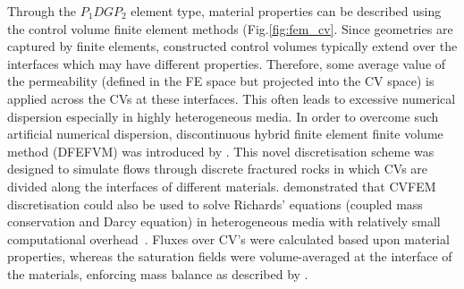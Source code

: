 \documentclass[preprint,authoryear,12pt]{elsarticle}
\newcommand{\KCnote}[1]{\fbox{\parbox{\textwidth}{ \color{black} KC Note $\Rightarrow$ #1}}}
\begin{document}
Through the $P_{1}DGP_{2}$ element type, material properties can be described using the control volume finite element methods (Fig.\ref{fig:fem_cv}. %
Since geometries are captured by finite elements, constructed control volumes typically extend over the interfaces which may have different properties. Therefore, some average value of the permeability (defined in the FE space but projected into the CV space) is applied across the CVs at these interfaces. This often leads to excessive numerical dispersion especially in highly heterogeneous media. In order to overcome such artificial numerical dispersion, discontinuous hybrid finite element finite volume method (DFEFVM) was introduced by \citet{nick_2011b, nick_2011a}. This novel discretisation scheme was designed to simulate flows through discrete fractured rocks in which CVs are divided along the interfaces of different materials. \citet{cumming_2011} demonstrated that CVFEM discretisation could also be used to solve Richards' equations (coupled mass conservation and Darcy equation) in heterogeneous media with relatively small computational overhead~\citep[compared with traditional coupled velocity-pressure based formulations, see also][]{cumming_phd2012}. Fluxes over CV's were calculated based upon material properties, whereas the saturation fields were volume-averaged at the interface of the materials, enforcing mass balance as described by \citet{kirkland_1992}.

\end{document}
